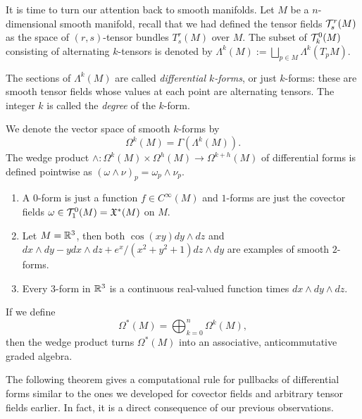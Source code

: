 It is time to turn our attention back to smooth manifolds.
Let $M$ be a $n$-dimensional smooth manifold, recall that we had defined the tensor fields $\mathcal{T}_s^r(M)$ as the space of $(r,s)$-tensor bundles $T_s^r(M)$ over $M$.
The subset of $\mathcal{T}_k^0(M)$ consisting of alternating $k$-tensors is denoted by $\Lambda^k(M):= \bigsqcup_{p\in M} \Lambda^k(T_p M)$.
\begin{definition}
  The sections of $\Lambda^k(M)$ are called \emph{differential $k$-forms}, or just $k$-forms: these are smooth tensor fields whose values at each point are alternating tensors. The integer $k$ is called the \emph{degree} of the $k$-form.
  
  We denote the vector space of smooth $k$-forms by
  \begin{equation}
    \Omega^k(M) = \Gamma(\Lambda^k(M)).
  \end{equation}
  The wedge product $\wedge:\Omega^k(M)\times\Omega^h(M)\to \Omega^{k+h}(M)$ of differential forms is defined pointwise as ${(\omega\wedge\nu)}_p = \omega_p\wedge\nu_p$.
\end{definition}

\begin{example}
  \begin{enumerate}
    \item A $0$-form is just a function $f\in C^\infty(M)$ and $1$-forms are just the covector fields $\omega\in\mathcal{T}_1^0(M) = \mathfrak{X}^*(M)$ on $M$.
    \item Let $M=\mathbb{R}^3$, then both $\cos(xy)dy\wedge dz$ and $dx\wedge dy - y dx\wedge dz + e^x/(x^2+y^2+1) dz\wedge dy$ are examples of smooth $2$-forms.
    \item Every $3$-form in $\mathbb{R}^3$ is a continuous real-valued function times $dx\wedge dy\wedge dz$.
  \end{enumerate}
\end{example}

\begin{remark}
  If we define
  \begin{equation}
    \Omega^*(M) = \bigoplus_{k=0}^n \Omega^k(M),
  \end{equation}
  then the wedge product turns $\Omega^*(M)$ into an associative, anticommutative graded algebra.    
\end{remark}

The following theorem gives a computational rule for pullbacks of differential forms similar to the ones we developed for covector fields and arbitrary tensor fields earlier.
In fact, it is a direct consequence of our previous observations.

